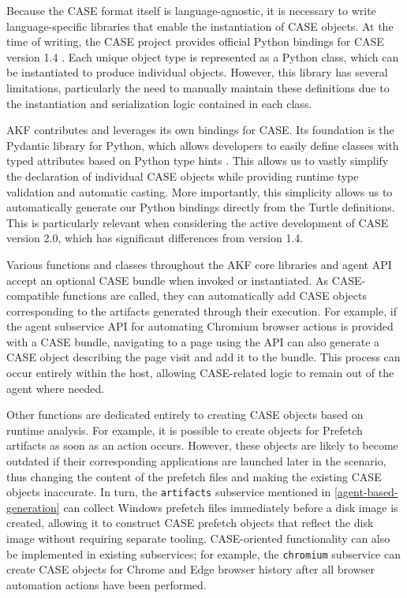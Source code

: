 \documentclass[final,5p,times,twocolumn]{elsarticle}
\newcommand{\passthrough}[1]{#1}
\begin{document}
Because the CASE format itself is language-agnostic, it is necessary to
write language-specific libraries that enable the instantiation of CASE
objects. At the time of writing, the CASE project provides official
Python bindings for CASE version 1.4
\cite{CaseworkCASEMappingPython}. Each unique object type is
represented as a Python class, which can be instantiated to produce
individual objects. However, this library has several limitations,
particularly the need to manually maintain these definitions due to the
instantiation and serialization logic contained in each class.

AKF contributes and leverages its own bindings for CASE. Its foundation
is the Pydantic library for Python, which allows developers to easily
define classes with typed attributes based on Python type hints
\cite{colvinPydantic2024}. This allows us to vastly simplify the
declaration of individual CASE objects while providing runtime type
validation and automatic casting. More importantly, this simplicity
allows us to automatically generate our Python bindings directly from
the Turtle definitions. This is particularly relevant when considering
the active development of CASE version 2.0, which has significant
differences from version 1.4.

Various functions and classes throughout the AKF core libraries and
agent API accept an optional CASE bundle when invoked or instantiated.
As CASE-compatible functions are called, they can automatically add CASE
objects corresponding to the artifacts generated through their
execution. For example, if the agent subservice API for automating
Chromium browser actions is provided with a CASE bundle, navigating to a
page using the API can also generate a CASE object describing the page
visit and add it to the bundle. This process can occur entirely within
the host, allowing CASE-related logic to remain out of the agent where
needed.

Other functions are dedicated entirely to creating CASE objects based on
runtime analysis. For example, it is possible to create objects for
Prefetch artifacts as soon as an action occurs. However, these objects
are likely to become outdated if their corresponding applications are
launched later in the scenario, thus changing the content of the
prefetch files and making the existing CASE objects inaccurate. In turn,
the \passthrough{\lstinline!artifacts!} subservice mentioned in
\autoref{agent-based-generation} can collect Windows prefetch
files immediately before a disk image is created, allowing it to
construct CASE prefetch objects that reflect the disk image without
requiring separate tooling. CASE-oriented functionality can also be
implemented in existing subservices; for example, the
\passthrough{\lstinline!chromium!} subservice can create CASE objects
for Chrome and Edge browser history after all browser automation actions
have been performed.
\end{document}
